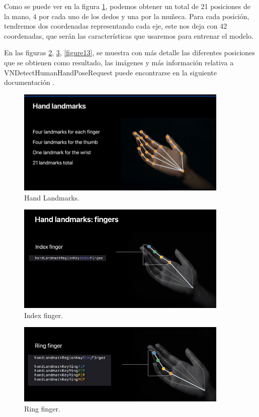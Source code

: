 \documentclass[../main.tex]{subfiles}
\begin{document}
Como se puede ver en la figura \ref{figure10}, podemos obtener un total de 21 posiciones de la mano, 4 por cada uno de los dedos y una por la muñeca. Para cada posición, tendremos dos coordenadas representando cada eje, este nos deja con 42 coordenadas, que serán las características que usaremos para entrenar el modelo.

En las figuras \ref{figure11}, \ref{figure12}, \ref{figure13}, se muestra con más detalle las diferentes posiciones que se obtienen como resultado, las imágenes y más información relativa a VNDetectHumanHandPoseRequest puede encontrarse en la siguiente documentación \cite{wwdchandpose}.


\begin{figure}[h]
\centering 
\includegraphics[width=0.9\textwidth]{images/trainingapp/handpose/hanpose1.png}
\caption{Hand Landmarks.}
\label{figure10}
\end{figure}

\begin{figure}[h]
\centering 
\includegraphics[width=0.9\textwidth]{images/trainingapp/handpose/handpose2.png}
\caption{Index finger.}
\label{figure11}
\end{figure}

\begin{figure}[h]
\centering 
\includegraphics[width=0.9\textwidth]{images/trainingapp/handpose/handpose3.png}
\caption{Ring finger.}
\label{figure12}
\end{figure}
\end{document}
